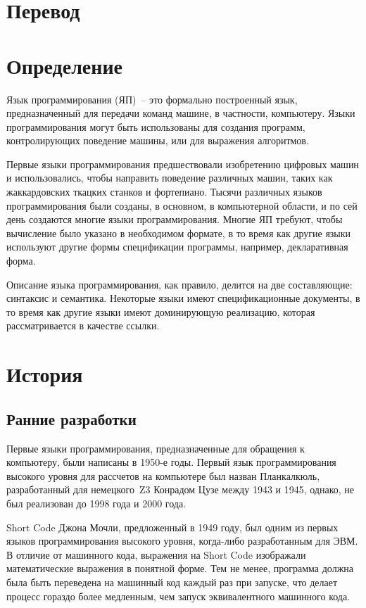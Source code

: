 \newpage
\setcounter{chapter}{0}
\chapter*{Перевод}
\vspace{-1em}

\chapter{Определение}
Язык программирования (ЯП)~-- это формально построенный язык, предназначенный для
передачи команд машине, в частности, компьютеру. Языки программирования могут
быть использованы для создания программ, контролирующих поведение машины, или
для выражения алгоритмов.

Первые языки программирования предшествовали изобретению цифровых машин и
использовались, чтобы направить поведение различных машин, таких как
жаккардовских ткацких станков и фортепиано. Тысячи различных языков
программирования были созданы, в основном, в компьютерной области, и по сей
день создаются многие языки программирования. Многие ЯП требуют, чтобы
вычисление было указано в необходимом формате, в то время как другие языки
используют другие формы спецификации программы, например, декларативная форма.

Описание языка программирования, как правило, делится на две составляющие:
синтаксис и семантика. Некоторые языки имеют спецификационные документы, в то
время как другие языки имеют доминирующую реализацию, которая рассматривается в
качестве ссылки.

\chapter{История}
\section{Ранние разработки}
Первые языки программирования, предназначенные для обращения к компьютеру, были
написаны в 1950-е годы. Первый язык программирования высокого уровня для
рассчетов на компьютере был назван Планкалкюль, разработанный для немецкого~Z3
Конрадом Цузе между 1943 и 1945, однако, не был реализован до 1998 года и 2000
года.

Short Code Джона Мочли, предложенный в 1949 году, был одним из первых языков
программирования высокого уровня, когда-либо разработанным для ЭВМ. В отличие
от машинного кода, выражения на Short Code изображали математические выражения
в понятной форме. Тем не менее, программа должна была быть переведена на
машинный код каждый раз при запуске, что делает процесс гораздо более
медленным, чем запуск эквивалентного машинного кода.

